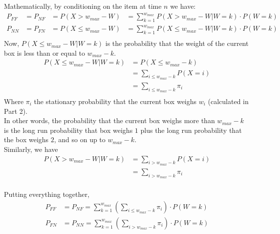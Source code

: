 \documentclass[10pt,a4paper]{article}
\begin{document}
Mathematically, by conditioning on the item at time $ n $ we have:\\
\begin{align*}
P_{FF} &= P_{NF} &= P(X > w_{max} -W) &= \sum\limits_{k=1}^{w_{max}} P(X > w_{max} -W | W=k)\cdot P(W=k)  \\
P_{NN} &= P_{FN} &= P(X \leq w_{max} -W) &=\sum\limits_{k=1}^{w_{max}} P(X \leq w_{max} -W | W=k)\cdot P(W=k) \\
\end{align*}
Now, $ P(X \leq w_{max} -W | W=k) $ is the probability that the weight of the current box is less than or equal to $ w_{max} - k $. \\
\begin{align*}
P(X \leq w_{max} - W| W=k) &= P(X \leq w_{max} -k)\\
&= \sum_{i \leq w_{max}-k} P(X = i) \\
&= \sum_{i \leq w_{max} - k} \pi_i \\
\end{align*}
Where $\pi_i$ the stationary probability that the current box weighs $w_i$ (calculated in Part 2). \\
In other words, the probability that the current box weighs more than $ w_{max} - k $ is the long run probability that box weighs $1$ plus the long run probability that the box weighs $2$, and so on up to $ w_{max} - k $. \\

Similarly, we have \\
\begin{align*}
P(X > w_{max} -W | W=k) &= \sum_{i > w_{max}-k} P(X = i)\\ 
&= \sum_{i > w_{max} -k} \pi_i \\
\end{align*}

Putting everything together, \\
\begin{align*}
P_{FF} &= P_{NF} = \sum\limits_{k=1}^{w_{max}} \left(\sum_{i \leq w_{max} -k} \pi_i \right) \cdot P(W=k)  \\
P_{FN} &= P_{NN} = \sum\limits_{k=1}^{w_{max}} \left(\sum_{i > w_{max} -k} \pi_i \right) \cdot P(W=k) \\
\end{align*}
\end{document}

